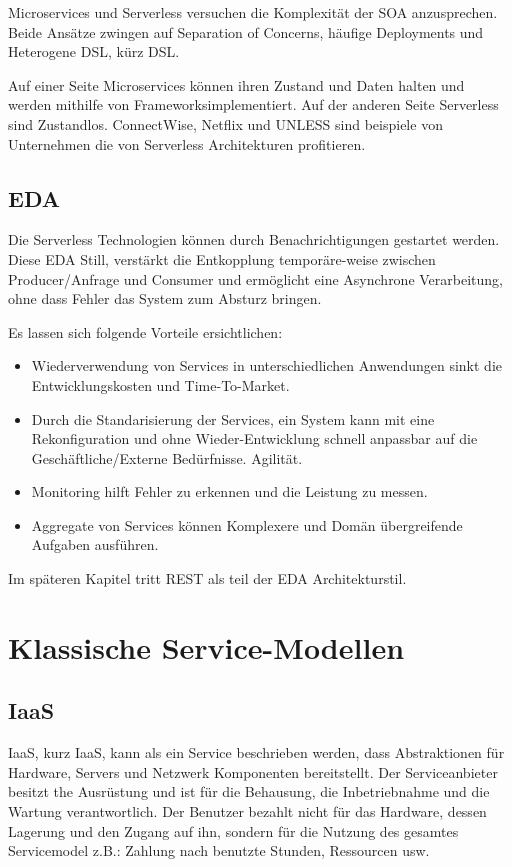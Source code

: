 \documentclass[
12pt,
english,
ngerman,
headsepline,
twoside,
openright,
numbers=noenddot,version=first
]{scrreprt}
\begin{document}
Microservices und Serverless versuchen die Komplexität der SOA anzusprechen. Beide Ansätze zwingen auf Separation of Concerns, häufige Deployments und Heterogene \acrfull{DSL}, kürz \acrshort{DSL}.


Auf einer Seite Microservices können ihren Zustand und Daten halten und werden mithilfe von \glqq Frameworks\grqq implementiert. Auf der anderen Seite Serverless sind Zustandlos.
ConnectWise\cite{ConnectWise}, Netflix\cite{Netflix} und UNLESS\cite{UNLESS} sind beispiele von Unternehmen die von Serverless Architekturen profitieren.

\section{EDA}

Die Serverless Technologien können durch Benachrichtigungen gestartet werden. Diese \acrfull{EDA} Still, verstärkt die Entkopplung temporäre-weise zwischen Producer/Anfrage und Consumer und ermöglicht eine Asynchrone Verarbeitung, ohne dass Fehler das System zum Absturz bringen.


Es lassen sich folgende Vorteile ersichtlichen:
\begin{itemize}
	\item Wiederverwendung von Services in unterschiedlichen Anwendungen sinkt die Entwicklungskosten und Time-To-Market.
	\item Durch die Standarisierung der Services, ein System kann mit eine Rekonfiguration und ohne Wieder-Entwicklung schnell anpassbar auf die Geschäftliche/Externe Bedürfnisse. Agilität.
	\item Monitoring hilft Fehler zu erkennen und die Leistung zu messen.
	\item Aggregate von Services können Komplexere und Domän übergreifende Aufgaben ausführen.
\end{itemize}
Im späteren Kapitel tritt REST als teil der \acrshort{EDA} Architekturstil.


\chapter{Klassische Service-Modellen}
\label{chap:service-models}


\section{IaaS}
\label{sec:iaas}
\acrfull{IaaS}, kurz \acrshort{IaaS}, kann als ein Service beschrieben werden, dass Abstraktionen für Hardware, Servers und Netzwerk Komponenten bereitstellt. Der Serviceanbieter besitzt the Ausrüstung und ist für die Behausung, die Inbetriebnahme und die Wartung verantwortlich\cite{patternAWS}. Der Benutzer bezahlt nicht für das Hardware, dessen Lagerung und den Zugang auf ihn, sondern für die Nutzung des gesamtes Servicemodel z.B.: Zahlung nach benutzte Stunden, Ressourcen usw.
\end{document}
